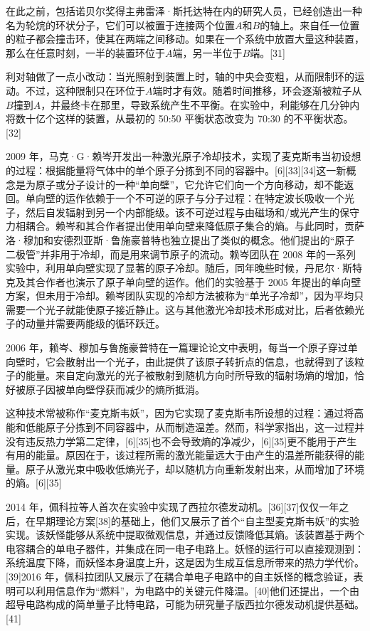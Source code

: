 在此之前，包括诺贝尔奖得主弗雷泽·斯托达特在内的研究人员，已经创造出一种名为轮烷的环状分子，它们可以被置于连接两个位置$A$和$B$的轴上。来自任一位置的粒子都会撞击环，使其在两端之间移动。如果在一个系统中放置大量这种装置，那么在任意时刻，一半的装置环位于$A$端，另一半位于$B$端。[31]

利对轴做了一点小改动：当光照射到装置上时，轴的中央会变粗，从而限制环的运动。不过，这种限制只在环位于$A$端时才有效。随着时间推移，环会逐渐被粒子从 $B$撞到$A$，并最终卡在那里，导致系统产生不平衡。在实验中，利能够在几分钟内将数十亿个这样的装置，从最初的 50:50 平衡状态改变为 70:30 的不平衡状态。[32]

2009 年，马克·G·赖岑开发出一种激光原子冷却技术，实现了麦克斯韦当初设想的过程：根据能量将气体中的单个原子分拣到不同的容器中。[6][33][34]这一新概念是为原子或分子设计的一种“单向壁”，它允许它们向一个方向移动，却不能返回。单向壁的运作依赖于一个不可逆的原子与分子过程：在特定波长吸收一个光子，然后自发辐射到另一个内部能级。该不可逆过程与由磁场和/或光产生的保守力相耦合。赖岑和其合作者提出使用单向壁来降低原子集合的熵。与此同时，贡萨洛·穆加和安德烈亚斯·鲁施豪普特也独立提出了类似的概念。他们提出的“原子二极管”并非用于冷却，而是用来调节原子的流动。赖岑团队在 2008 年的一系列实验中，利用单向壁实现了显著的原子冷却。随后，同年晚些时候，丹尼尔·斯特克及其合作者也演示了原子单向壁的运作。他们的实验基于 2005 年提出的单向壁方案，但未用于冷却。赖岑团队实现的冷却方法被称为“单光子冷却”，因为平均只需要一个光子就能使原子接近静止。这与其他激光冷却技术形成对比，后者依赖光子的动量并需要两能级的循环跃迁。

2006 年，赖岑、穆加与鲁施豪普特在一篇理论论文中表明，每当一个原子穿过单向壁时，它会散射出一个光子，由此提供了该原子转折点的信息，也就得到了该粒子的能量。来自定向激光的光子被散射到随机方向时所导致的辐射场熵的增加，恰好被原子因被单向壁俘获而减少的熵所抵消。

这种技术常被称作“麦克斯韦妖”，因为它实现了麦克斯韦所设想的过程：通过将高能和低能原子分拣到不同容器中，从而制造温差。然而，科学家指出，这一过程并没有违反热力学第二定律，[6][35]也不会导致熵的净减少，[6][35]更不能用于产生有用的能量。原因在于，该过程所需的激光能量远大于由产生的温差所能获得的能量。原子从激光束中吸收低熵光子，却以随机方向重新发射出来，从而增加了环境的熵。[6][35]

2014 年，佩科拉等人首次在实验中实现了西拉尔德发动机。[36][37]仅仅一年之后，在早期理论方案[38]的基础上，他们又展示了首个“自主型麦克斯韦妖”的实验实现。该妖怪能够从系统中提取微观信息，并通过反馈降低其熵。该装置基于两个电容耦合的单电子器件，并集成在同一电子电路上。妖怪的运行可以直接观测到：系统温度下降，而妖怪本身温度上升，这是因为生成互信息所带来的热力学代价。[39]2016 年，佩科拉团队又展示了在耦合单电子电路中的自主妖怪的概念验证，表明可以利用信息作为“燃料”，为电路中的关键元件降温。[40]他们还提出，一个由超导电路构成的简单量子比特电路，可能为研究量子版西拉尔德发动机提供基础。[41]
